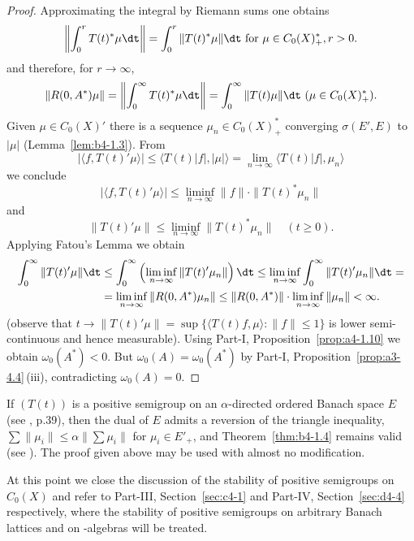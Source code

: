 \begin{proof}
Approximating the integral by Riemann sums one obtains 
\[
\left\|\int_0^r T(t)^*\mu \dt\right\| = \int_0^r \|T(t)^*\mu\| \dt \text{ for } \mu \in C_{0}(X)^*_{+} , r  >  0 .
\]
and therefore, for $r \to \infty$, 
\[
\|R(0,A^*)\mu\| = \left\|\int_0^{\infty} T(t)^*\mu \dt\right\| 
 = \int_0^{\infty} \|T(t)\mu\| \dt\  (\mu \in C_{0}(X)_{+}^{*}) .
\]
Given $\mu \in C_{0}(X)'$ there is a sequence $\mu_n \in C_{0}(X)^*_+$ converging $\sigma(E',E)$ to $|\mu|$ (Lemma~\ref{lem:b4-1.3}).
From 
%
\[
	 |\langle f,T(t)'\mu \rangle| \leq \langle T(t)|f|,|\mu| \rangle = \lim_{n\to\infty} \langle T(t)|f|,\mu_n \rangle 
\]
%
we conclude 
%
\[
	 |\langle f,T(t)'\mu \rangle| \leq \liminf_{n\to\infty}\|f\| \cdot \|T(t)^*\mu_n\| 
\]
%
and 
%
\[
	 \|T(t)'\mu\| \leq \liminf_{n\to\infty}\|T(t)^*\mu_n\| \quad (t \geq 0) .
\]
%
Applying Fatou's Lemma we obtain 
\[
\begin{aligned}
	\int_0^{\infty} \|T(t)'\mu\| \dt &\leq \int_0^{\infty} \left(\liminf_{n\to\infty} \|T(t)'\mu_n\|\right) \dt \leq  
	\liminf_{n\to\infty} \int_0^{\infty} \|T(t)'\mu_n\| \dt = \\ 
	& = \liminf_{n\to\infty} \|R(0,A^{*})\mu_n\| \leq \|R(0,A^{*})\|\cdot\liminf_{n\to\infty} \|\mu_n\| < \infty .
\end{aligned}
\]
(observe that $t \to \|T(t)'\mu\| = \sup \{\langle T(t)f,\mu \rangle \colon \|f\| \leq 1\}$ is lower semi-continuous and hence measurable). 
Using Part-I, Proposition~\ref{prop:a4-1.10} we obtain $\omega_{0}(A^{*})<0$. 
But $\omega_{0}(A) = \omega_{0}(A^{*})$ by Part-I, Proposition~\ref{prop:a3-4.4}\,(iii), contradicting $\omega_{0}(A) = 0$.
\end{proof}
\begin{remark}\label{rem:b4-1.5}%
If\/ $(T(t))$ is a positive semigroup on an $\alpha$-directed ordered Banach space $E$ (see \textcite{asimow:1980}, p.39), 
then the dual of\/ $E$ admits a reversion of the triangle inequality, 
\ie $\sum\|\mu_i\| \leq \alpha\|\sum\mu_i\|$ 
for $\mu_i \in E'_+$, 
and Theorem~\ref{thm:b4-1.4} remains valid (see \textcite{battydavies:1983}). 
The proof given above may be used with almost no modification.
\end{remark}
At this point we close the discussion of the stability of positive semigroups on $C_{0}(X)$ and refer to Part-III, Section~\ref{sec:c4-1} and Part-IV, Section~\ref{sec:d4-4}  respectively, where the stability of positive semigroups on arbitrary Banach lattices and on \CA-algebras will be treated.
